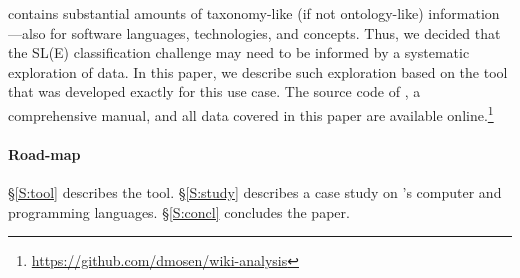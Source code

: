\Wikipedia{} contains substantial amounts of taxonomy-like (if not ontology-like) information---also for software languages, technologies, and concepts. Thus, we decided that the SL(E) classification challenge may need to be informed by a systematic exploration of \Wikipedia{} data. In this paper, we describe such exploration based on the \WikiTax{} tool that was developed exactly for this use case. The source code of \WikiTax, a comprehensive manual, and all data covered in this paper are available online.\footnote{\url{https://github.com/dmosen/wiki-analysis}}

\paragraph*{Road-map} \S\ref{S:tool} describes the \WikiTax{} tool. \S\ref{S:study} describes a case study on \Wikipedia's computer and programming languages. \S\ref{S:concl} concludes the paper. 

